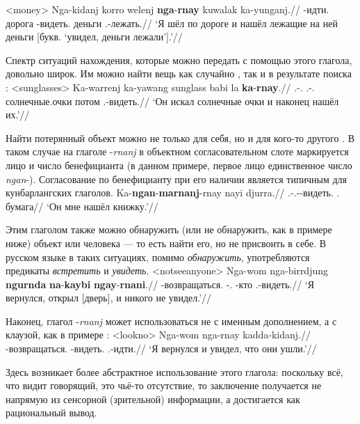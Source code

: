 \ex<money>\begingl
\gla Nga-kidanj korro welenj \textbf{nga}-\textbf{rnay} kuwalak ka-yunganj.//
\glb \nga-идти.\Pst{} \korro{} дорога \nga-видеть.\Pst{} деньги \Tsg.\Real-лежать.\Pst{}//
\glft `Я шёл по дороге и нашёл лежащие на ней деньги [букв. `увидел, деньги лежали'].'//%
\endgl\xe

Спектр ситуаций нахождения, которые можно передать с помощью этого глагола, довольно широк. Им можно найти вещь как случайно , так и в результате поиска :
\ex<sunglasses>\begingl
\gla Ka-warrenj ka-yawang sunglass babi la \textbf{ka}-\textbf{rnay}.//
\glb \Tsg.\Real-\warre.\Pst{} \Tsg.\Real-\yaw.\Pst{} солнечные.очки потом \la{} \Tsg.\Real-видеть.\Pst{}//
\glft `Он искал солнечные очки и наконец нашёл их.'//%
\endgl\xe

Найти потерянный объект можно не только для себя, но и для кого-то другого . В таком случае на глаголе -\textit{rnanj} в объектном согласовательном слоте маркируется лицо и число бенефицианта (в данном примере, первое лицо единственное число \textit{ngan}-). Согласование по бенефицианту при его наличии является типичным для кунбарлангских глаголов. 
\begingl
\gla Ka-\textbf{ngan}-\textbf{marnanj}-rnay nayi djurra.//
\glb \Tsg.\Real-\Fsg.\Obj-\Ben-видеть.\Pst{} \Nm.\Cli{} бумага//
\glft `Он мне нашёл книжку.'//%
\endgl\xe

Этим глаголом также можно обнаружить (или не обнаружить, как в примере  ниже) объект или человека --- то есть найти его, но не присвоить в себе. В русском языке в таких ситуациях, помимо \textit{обнаружить}, употребляются предикаты \textit{встретить} и \textit{увидеть}.
\ex<notseeanyone>\begingl
\gla Nga-wom nga-birrdjung \textbf{ngurnda} \textbf{na}-\textbf{kaybi} \textbf{ngay}-\textbf{rnani}.//
\glb \nga-возвращаться.\Pst{} \nga-\bdj.\Pst{} \Neg{} \Cli-кто \Fsg.\irrpst-видеть.\irrpst{}//
\glft `Я вернулся, открыл [дверь], и никого не увидел.'//%
\endgl\xe

Наконец, глагол -\textit{rnanj} может использоваться не с именным дополнением, а с клаузой, как в примере :
\ex<lookno>\begingl
\gla Nga-wom nga-rnay kadda-kidanj.//
\glb \nga-возвращаться.\Pst{} \nga-видеть.\Pst{} \Tpl.\Real-идти.\Pst{}//
\glft `Я вернулся и увидел, что они ушли.'//%
\endgl\xe

Здесь возникает более абстрактное использование этого глагола: поскольку всё, что видит говорящий, это чьё-то отсутствие, то заключение получается не напрямую из сенсорной (зрительной) информации, а достигается как рациональный вывод.


